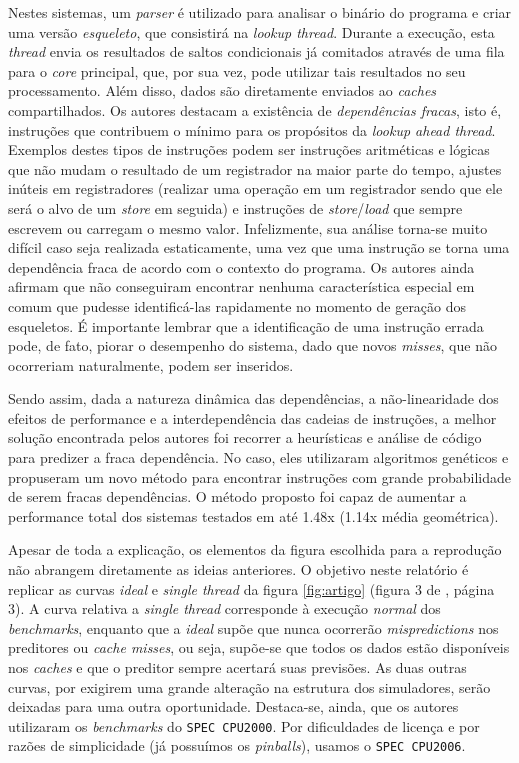 \documentclass[12pt]{article}
\begin{document}
Nestes sistemas, um \textit{parser} é utilizado para analisar o binário do
programa e criar uma versão \textit{esqueleto}, que consistirá na
\textit{lookup thread}. Durante a execução, esta \textit{thread} envia os
resultados de saltos condicionais já comitados através de uma fila para o
\textit{core} principal, que, por sua vez, pode utilizar tais resultados no seu
processamento. Além disso, dados são diretamente enviados ao \textit{caches}
compartilhados. Os autores destacam a existência de \textit{dependências
fracas}, isto é, instruções que contribuem o mínimo para os propósitos da
\textit{lookup ahead thread}. Exemplos destes tipos de instruções podem ser
instruções aritméticas e lógicas que não mudam o resultado de um registrador na
maior parte do tempo, ajustes inúteis em registradores (realizar uma operação em
um registrador sendo que ele será o alvo de um \textit{store} em seguida) e
instruções de \textit{store}/\textit{load} que sempre escrevem ou carregam o
mesmo valor. Infelizmente, sua análise torna-se muito difícil caso seja
realizada estaticamente, uma vez que uma instrução se torna uma dependência
fraca de acordo com o contexto do programa. Os autores ainda afirmam que não
conseguiram encontrar nenhuma característica especial em comum que pudesse
identificá-las rapidamente no momento de geração dos esqueletos. É importante
lembrar que a identificação de uma instrução errada pode, de fato, piorar o
desempenho do sistema, dado que novos \textit{misses}, que não ocorreriam
naturalmente, podem ser inseridos.

Sendo assim, dada a natureza dinâmica das dependências, a não-linearidade dos
efeitos de performance e a interdependência das cadeias de instruções, a melhor
solução encontrada pelos autores foi recorrer a heurísticas e análise de código
para predizer a fraca dependência. No caso, eles utilizaram algoritmos genéticos
e propuseram um novo método para encontrar instruções com grande probabilidade de
serem fracas dependências. O método proposto foi capaz de aumentar a performance
total dos sistemas testados em até 1.48x (1.14x média geométrica).

Apesar de toda a explicação, os elementos da figura escolhida para a reprodução
não abrangem diretamente as ideias anteriores. O objetivo neste relatório é
replicar as curvas \textit{ideal} e \textit{single thread} da figura
\ref{fig:artigo} (figura 3 de \cite{artigo}, página 3). A curva relativa a
\textit{single thread} corresponde à execução \textit{normal} dos
\textit{benchmarks}, enquanto que a \textit{ideal} supõe que nunca ocorrerão
\textit{mispredictions} nos preditores ou \textit{cache misses}, ou seja,
supõe-se que todos os dados estão disponíveis nos \textit{caches} e que o
preditor sempre acertará suas previsões.
As duas outras curvas, por exigirem uma grande alteração na estrutura dos
simuladores, serão deixadas para uma outra oportunidade. Destaca-se, ainda, que
os autores utilizaram os \textit{benchmarks} do \texttt{SPEC CPU2000}. Por
dificuldades de licença e por razões de simplicidade (já possuímos os
\textit{pinballs}), usamos o \texttt{SPEC CPU2006}. 
\end{document}
